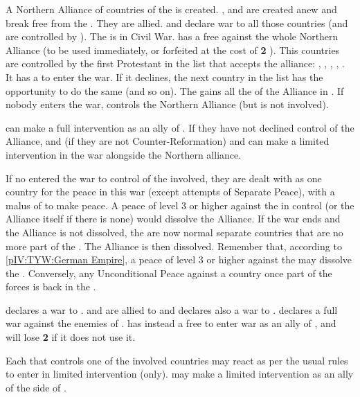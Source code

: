 \phevnt
\aparag A Northern Alliance of countries of the \HRE is created. \PRUMin,
\paysSaxe and \payspalatinat are created anew and break free from the
\GE. They are allied.
\aparag \GE and \hab declare war to all those countries (and are controlled by
\SPA). The \GE is in Civil War.
\bparag \AUS has a free \CB against the whole Northern Alliance (to be used
immediately, or forfeited at the cost of {\bf 2} \STAB).
\aparag This countries are controlled by the first Protestant \MAJ in the list
that accepts the alliance: \SUE, \ENG, \HOL, \FRA, \POL.  It has a \CB to
enter the war. If it declines, the next country in the list has the
opportunity to do the same (and so on).  The \MAJ gains all the \MIN of the
Alliance in \EG.  If nobody enters the war, \SUE controls the Northern
Alliance (but is not involved).

\phdipl
\aparag \SPA can make a full intervention as an ally of \HAB.
\aparag If they have not declined control of the Alliance, \FRA and \ENG (if
they are not Counter-Reformation) and \SUE can make a limited intervention in
the war alongside the Northern alliance.

\phpaix
\aparag If no \MAJ entered the war to control of the \MIN involved, they are
dealt with as one country for the peace in this war (except attempts of
Separate Peace), with a malus of  to make peace.
\aparag A peace of level 3 or higher against the \MAJ in control (or the
Alliance itself if there is none) would dissolve the Alliance.
\aparag If the war ends and the Alliance is not dissolved, the \MIN are now
normal separate countries that are no more part of the \GE. The Alliance is
then dissolved.
\aparag Remember that, according to \ref{pIV:TYW:German Empire}, a peace of
level 3 or higher against the \MAJHAB may dissolve the \GE.  Conversely, any
Unconditional Peace against a country once part of the \GE forces is back in
the \GE.



\phevnt
\aparag \paysBrandebourg declares a war to \paysBaviere.  \paysSaxe and
\payspalatinat are allied to \paysBrandebourg and declares also a war to
\paysBaviere.
\aparag \AUSMin declares a full war against the enemies of \paysBaviere.
\bparag \AUS has instead a free \CB to enter war as an ally of \paysBaviere,
and will lose {\bf 2} \STAB if it does not use it.

\phdipl
\aparag Each \MAJ that controls one of the involved countries may react as per
the usual rules to enter in limited intervention (only).
\aparag \SPA may make a limited intervention as an ally of the side of
\paysBaviere.

